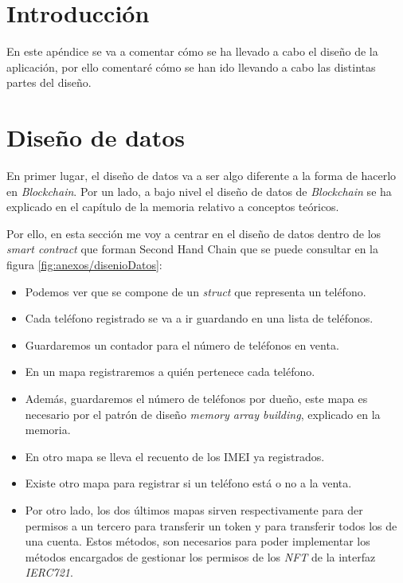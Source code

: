 
\section{Introducción}
En este apéndice se va a comentar cómo se ha llevado a cabo el diseño de la aplicación, por ello comentaré cómo se han ido llevando a cabo las distintas partes del diseño.
\section{Diseño de datos}

En primer lugar, el diseño de datos va a ser algo diferente a la forma de hacerlo en \textit{Blockchain}. Por un lado, a bajo nivel el diseño de datos de \textit{Blockchain} se ha explicado en el capítulo de la memoria relativo a conceptos teóricos.


Por ello, en esta sección me voy a centrar en el diseño de datos dentro de los \textit{smart contract} que forman Second Hand Chain que se puede consultar en la figura \ref{fig:anexos/disenioDatos}:


\begin{itemize}
    \item Podemos ver que se compone de un  \textit{struct} que representa un teléfono.
    \item Cada teléfono registrado se va a ir guardando en una lista de teléfonos.
    \item Guardaremos un contador para el número de teléfonos en venta.
    \item En un mapa registraremos a quién pertenece cada teléfono.
    \item Además, guardaremos el número de teléfonos por dueño, este mapa es necesario por el patrón de diseño \textit{memory array building}, explicado en la memoria.
    \item En otro mapa se lleva el recuento de los IMEI ya registrados.
    \item Existe otro mapa para registrar si un teléfono está o no a la venta.
    \item Por otro lado, los dos últimos mapas sirven respectivamente para der permisos a un tercero para transferir un token y para transferir todos los de una cuenta. Estos métodos, son necesarios para poder implementar los métodos encargados de gestionar los permisos de los \textit{NFT} de la interfaz \textit{IERC721}.
    
\end{itemize}

